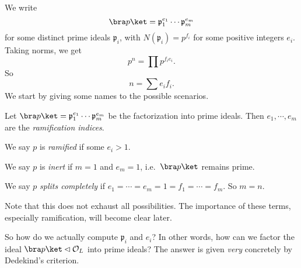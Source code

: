\documentclass[a4paper]{article}
\begin{document}
We write
\[
  \bra p\ket = \mathfrak{p}_1^{e_1} \cdots \mathfrak{p}_m^{e_m}
\]
for some distinct prime ideals $\mathfrak{p}_i$, with $N(\mathfrak{p}_i) = p^{f_i}$ for some positive integers $e_i$. Taking norms, we get
\[
  p^n = \prod p^{f_i e_i}.
\]
So
\[
  n = \sum e_i f_i.
\]
We start by giving some names to the possible scenarios.
\begin{defi}
  Let $\bra p\ket = \mathfrak{p}_1^{e_1} \cdots \mathfrak{p}_m^{e_m}$ be the factorization into prime ideals. Then $e_1, \cdots, e_m$ are the \emph{ramification indices}.
\end{defi}

\begin{defi}
  We say $p$ is \emph{ramified} if some $e_i > 1$.
\end{defi}

\begin{defi}
  We say $p$ is \emph{inert} if $m = 1$ and $e_m = 1$, i.e.\ $\bra p\ket$ remains prime.
\end{defi}

\begin{defi}
  We say $p$ \emph{splits completely} if $e_1 = \cdots = e_m = 1 = f_1 = \cdots = f_m$. So $m = n$.
\end{defi}
Note that this does not exhaust all possibilities. The importance of these terms, especially ramification, will become clear later.

So how do we actually compute $\mathfrak{p}_i$ and $e_i$? In other words, how can we factor the ideal $\bra p\ket \lhd \mathcal{O}_L$ into prime ideals? The answer is given \emph{very} concretely by Dedekind's criterion.
\end{document}
